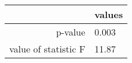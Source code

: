 \begin{tabular}{|r|l|}
  \hline
   \rowcolor{Gray}
    & values \\
  \hline
  p-value & 0.003 \\
  \hline
  value of statistic F & 11.87 \\
  \hline
\end{tabular}
